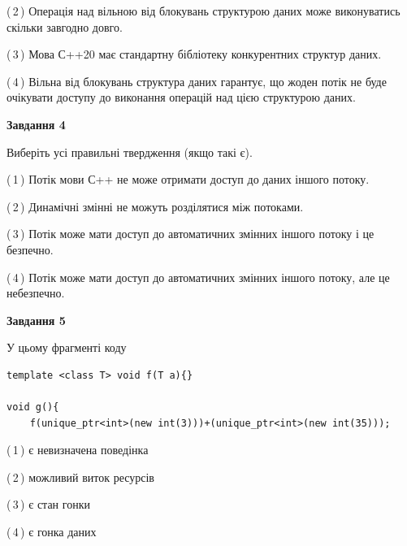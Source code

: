 \documentclass[12pt, ukrainian]{article}
\begin{document}
\begin {large}
{(\,2\,) Операція над вільною від блокувань структурою даних може виконуватись скільки завгодно довго.%

(\,3\,) Мова С++20 має стандартну бібліотеку конкурентних структур даних.%

(\,4\,) Вільна від блокувань структура даних гарантує, що жоден потік не буде очікувати доступу до виконання операцій над цією структурою даних.%



\begin{center}
\textbf{Завдання 4}
\end{center}
Виберіть усі правильні твердження (якщо такі є).\par
\vspace{2mm}

(\,1\,) Потік мови С++ не може отримати доступ до даних іншого потоку.%

(\,2\,) Динамічні змінні не можуть розділятися між потоками.%

(\,3\,) Потік може мати доступ до автоматичних змінних іншого потоку і це безпечно.%

(\,4\,) Потік може мати доступ до автоматичних змінних іншого потоку, але це небезпечно.%



\begin{center}
\textbf{Завдання 5}
\end{center}
У цьому фрагменті коду
\begin{verbatim}
template <class T> void f(T a){}

void g(){
    f(unique_ptr<int>(new int(3)))+(unique_ptr<int>(new int(35)));
\end{verbatim}

(\,1\,) є невизначена поведінка%

(\,2\,) можливий виток ресурсів%

(\,3\,) є стан гонки%

(\,4\,) є гонка даних%


}
\end {large}
\end{document}
